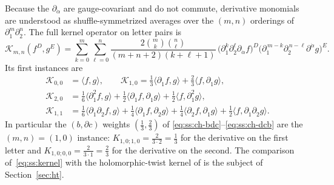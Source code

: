 Because the $\partial_{\dot\alpha}$ are gauge-covariant and do not commute,
derivative monomials are understood as shuffle-symmetrized averages over the
$(m,n)$ orderings of $\partial_{\dot1}^{m}\partial_{\dot2}^{n}$. The full
kernel operator on letter pairs is
\begin{equation}\label{eq:ss:kerneloperator}
\mathcal K_{m,n}(f^{D},g^{E})
=\sum_{k=0}^{m}\sum_{\ell=0}^{n}
\frac{2\binom{m}{k}\binom{n}{\ell}}{(m+n+2)(k+\ell+1)}\,
\big(\partial_{\dot1}^{k}\partial_{\dot2}^{\ell}\partial_{\dot\alpha}f\big)^{D}
\big(\partial_{\dot1}^{\,m-k}\partial_{\dot2}^{\,n-\ell}
\partial^{\dot\alpha}g\big)^{E} .
\end{equation}
Its first instances are
\begin{align}
\mathcal K_{0,0}&=\langle f,g\rangle,
\qquad
\mathcal K_{1,0}=\frac13\langle\partial_{\dot1}f,g\rangle
+\frac23\langle f,\partial_{\dot1}g\rangle,
\label{eq:ss:kernelexamples1}\\
\mathcal K_{2,0}&=\frac16\langle\partial_{\dot1}^{2}f,g\rangle
+\frac12\langle\partial_{\dot1}f,\partial_{\dot1}g\rangle
+\frac12\langle f,\partial_{\dot1}^{2}g\rangle,
\label{eq:ss:kernelexamples2}\\
\mathcal K_{1,1}&=\frac16\langle\partial_{\dot1}\partial_{\dot2}f,g\rangle
+\frac14\langle\partial_{\dot1}f,\partial_{\dot2}g\rangle
+\frac14\langle\partial_{\dot2}f,\partial_{\dot1}g\rangle
+\frac12\langle f,\partial_{\dot1}\partial_{\dot2}g\rangle .
\label{eq:ss:kernelexamples3}
\end{align}
In particular the $(b,\partial c)$ weights $(\tfrac13,\tfrac23)$ of
\eqref{eq:ss:ch-bdc}--\eqref{eq:ss:ch-dcb} are the $(m,n)=(1,0)$ instance:
$K_{1,0;1,0}=\tfrac{2}{3\cdot2}=\tfrac13$ for the derivative on the first
letter and $K_{1,0;0,0}=\tfrac{2}{3\cdot1}=\tfrac23$ for the derivative on
the second. The comparison of~\eqref{eq:ss:kernel} with the holomorphic-twist
kernel of \cite{BK} is the subject of Section~\ref{sec:ht}.
